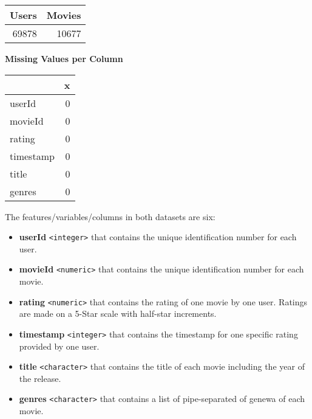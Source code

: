 \documentclass[]{article}
\providecommand{\tightlist}{%
  \setlength{\itemsep}{0pt}\setlength{\parskip}{0pt}}
\begin{document}
\begin{table}[H]
\centering\begingroup\fontsize{10}{12}\selectfont

\begin{tabular}{r|r}
\hline
Users & Movies\\
\hline
69878 & 10677\\
\hline
\end{tabular}
\endgroup{}
\end{table}

\textbf{Missing Values per Column}

\begin{table}[H]
\centering\begingroup\fontsize{10}{12}\selectfont

\begin{tabular}{l|r}
\hline
  & x\\
\hline
userId & 0\\
\hline
movieId & 0\\
\hline
rating & 0\\
\hline
timestamp & 0\\
\hline
title & 0\\
\hline
genres & 0\\
\hline
\end{tabular}
\endgroup{}
\end{table}

The features/variables/columns in both datasets are six:

\begin{itemize}
\tightlist
\item
  \textbf{userId} \texttt{\textless{}integer\textgreater{}} that
  contains the unique identification number for each user.
\item
  \textbf{movieId} \texttt{\textless{}numeric\textgreater{}} that
  contains the unique identification number for each movie.
\item
  \textbf{rating} \texttt{\textless{}numeric\textgreater{}} that
  contains the rating of one movie by one user. Ratings are made on a
  5-Star scale with half-star increments.
\item
  \textbf{timestamp} \texttt{\textless{}integer\textgreater{}} that
  contains the timestamp for one specific rating provided by one user.
\item
  \textbf{title} \texttt{\textless{}character\textgreater{}} that
  contains the title of each movie including the year of the release.
\item
  \textbf{genres} \texttt{\textless{}character\textgreater{}} that
  contains a list of pipe-separated of genewa of each movie.
\end{itemize}
\end{document}
